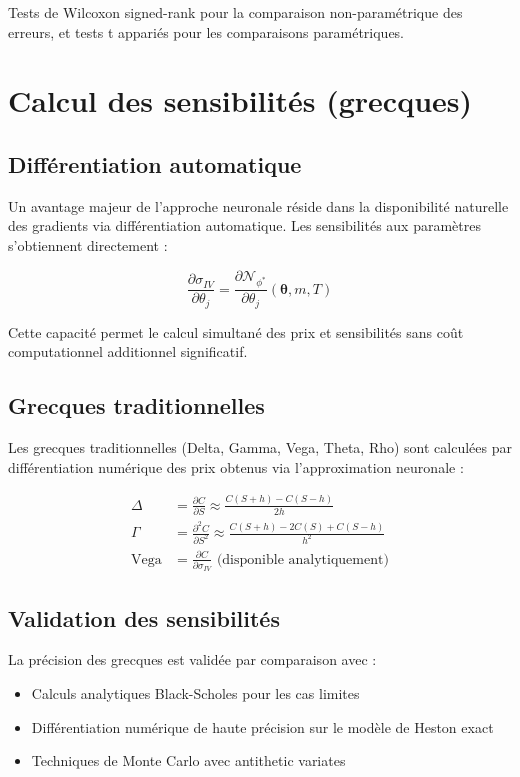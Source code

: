 Tests de Wilcoxon signed-rank pour la comparaison non-paramétrique des erreurs, et tests t appariés pour les comparaisons paramétriques.

\section{Calcul des sensibilités (grecques)}

\subsection{Différentiation automatique}

Un avantage majeur de l'approche neuronale réside dans la disponibilité naturelle des gradients via différentiation automatique. Les sensibilités aux paramètres s'obtiennent directement :

\begin{equation}
\frac{\partial \sigma_{IV}}{\partial \theta_j} = \frac{\partial \mathcal{N}_{\phi^*}}{\partial \theta_j}(\boldsymbol{\theta}, m, T)
\end{equation}

Cette capacité permet le calcul simultané des prix et sensibilités sans coût computationnel additionnel significatif.

\subsection{Grecques traditionnelles}

Les grecques traditionnelles (Delta, Gamma, Vega, Theta, Rho) sont calculées par différentiation numérique des prix obtenus via l'approximation neuronale :

\begin{align}
\Delta &= \frac{\partial C}{\partial S} \approx \frac{C(S+h) - C(S-h)}{2h} \\
\Gamma &= \frac{\partial^2 C}{\partial S^2} \approx \frac{C(S+h) - 2C(S) + C(S-h)}{h^2} \\
\text{Vega} &= \frac{\partial C}{\partial \sigma_{IV}} \text{ (disponible analytiquement)}
\end{align}

\subsection{Validation des sensibilités}

La précision des grecques est validée par comparaison avec :
\begin{itemize}
\item Calculs analytiques Black-Scholes pour les cas limites
\item Différentiation numérique de haute précision sur le modèle de Heston exact
\item Techniques de Monte Carlo avec antithetic variates
\end{itemize}

